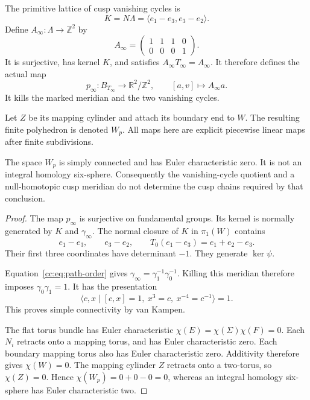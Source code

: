 The primitive lattice of cusp vanishing cycles is
\[
K=N\Lambda=\langle e_1-e_3,e_3-e_2\rangle.
\]
Define $A_\infty:\Lambda\to\mathbb Z^2$ by
\begin{equation}\label{cc:eq:A}
A_\infty=\begin{pmatrix}1&1&1&0\\0&0&0&1\end{pmatrix}.
\end{equation}
It is surjective, has kernel $K$, and satisfies $A_\infty T_\infty=A_\infty$.
It therefore defines the actual map
\begin{equation}\label{cc:eq:p}
p_\infty:B_{T_\infty}\longrightarrow\mathbb R^2/\mathbb Z^2,
\qquad [a,v]\longmapsto A_\infty a.
\end{equation}
It kills the marked meridian and the two vanishing cycles.

Let $Z$ be its mapping cylinder and attach its boundary end to $W$.
The resulting finite polyhedron is denoted $W_p$.
All maps here are explicit piecewise linear maps after finite subdivisions.

\begin{theorem}\label{cc:thm:cusp-obstruction}
The space $W_p$ is simply connected and has Euler characteristic zero.
It is not an integral homology six-sphere.
Consequently the vanishing-cycle quotient and a null-homotopic cusp
meridian do not determine the cusp chains required by that conclusion.
\end{theorem}

\begin{proof}
The map $p_\infty$ is surjective on fundamental groups.
Its kernel is normally generated by $K$ and $\gamma_\infty$.
The normal closure of $K$ in $\pi_1(W)$ contains
\[
e_1-e_3,\qquad e_3-e_2,\qquad T_0(e_1-e_3)=e_1+e_2-e_3.
\]
Their first three coordinates have determinant $-1$. They generate
$\ker\psi$.

Equation~\eqref{cc:eq:path-order} gives
$\gamma_\infty=\gamma_1^{-1}\gamma_0^{-1}$.
Killing this meridian therefore imposes $\gamma_0\gamma_1=1$.
It has the presentation
\[
\langle c,x\mid [c,x]=1,\ x^3=c,\ x^{-4}=c^{-1}\rangle=1.
\]
This proves simple connectivity by van Kampen.

The flat torus bundle has Euler characteristic
$\chi(E)=\chi(\Sigma)\chi(F)=0$.
Each $N_i$ retracts onto a mapping torus, and has Euler characteristic zero.
Each boundary mapping torus also has Euler characteristic zero.
Additivity therefore gives $\chi(W)=0$.
The mapping cylinder $Z$ retracts onto a two-torus, so $\chi(Z)=0$.
Hence $\chi(W_p)=0+0-0=0$, whereas an integral homology six-sphere
has Euler characteristic two.
\end{proof}

